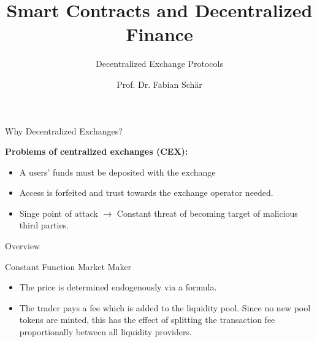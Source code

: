 \documentclass[]{beamer}
\title{Smart Contracts and Decentralized Finance}
\subtitle{Decentralized Exchange Protocols}
\author{Prof. Dr. Fabian Schär}
\institute{University of Basel}
\begin{document}
\thispagestyle{empty}
\begin{frame}[noframenumbering]
	\titlepage
\end{frame}


\begin{frame}{Why Decentralized Exchanges?}

	\textbf{Problems of centralized exchanges (CEX):}
		\begin{small}
		\begin{itemize}
			\item A users' funds must be deposited with the exchange
			\item Access is forfeited and trust towards the exchange operator needed.
			\item Singe point of attack $\rightarrow$ Constant threat of becoming target of malicious third parties.
		\end{itemize}
		\end{small}	

\vspace{1.5em}

\end{frame}

\begin{frame}{Overview}
	\begin{figure}[h!]
		
	\end{figure}
\end{frame}	


\begin{frame}{Constant Function Market Maker}

	\begin{figure}	
		\centering
		
	\end{figure}

	\begin{itemize}
		\item<5-> {The price is determined endogenously via a formula.}
		\item<6-> The trader pays a fee which is added to the liquidity pool. Since no new pool tokens are minted, this has the effect of splitting the transaction fee proportionally between all liquidity providers.
	\end{itemize}


\end{frame}
\end{document}
